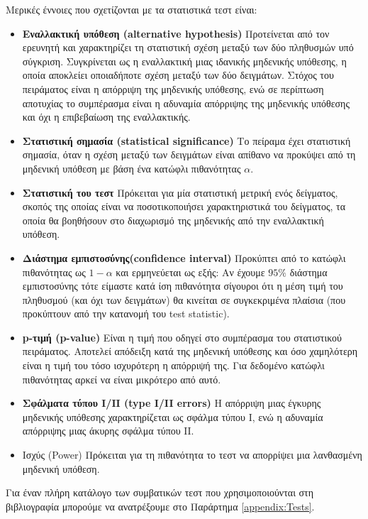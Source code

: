 Μερικές έννοιες που σχετίζονται με τα στατιστικά τεστ είναι:
\begin{itemize}
	\item \textbf{Εναλλακτική υπόθεση (alternative hypothesis)} Προτείνεται από τον ερευνητή και χαρακτηρίζει τη στατιστική σχέση μεταξύ των δύο πληθυσμών υπό σύγκριση. Συγκρίνεται ως η εναλλακτική μιας ιδανικής μηδενικής υπόθεσης, η οποία αποκλείει οποιαδήποτε σχέση μεταξύ των δύο δειγμάτων. Στόχος του πειράματος είναι η απόρριψη της μηδενικής υπόθεσης, ενώ σε περίπτωση αποτυχίας το συμπέρασμα είναι η αδυναμία απόρριψης της μηδενικής υπόθεσης και όχι η επιβεβαίωση της εναλλακτικής.
	\item \textbf{Στατιστική σημασία (statistical significance)} Το πείραμα έχει στατιστική σημασία, όταν η σχέση μεταξύ των δειγμάτων είναι απίθανο να προκύψει από τη μηδενική υπόθεση με βάση ένα κατώφλι πιθανότητας $\alpha$.
	\item \textbf{Στατιστική του τεστ} Πρόκειται για μία στατιστική μετρική ενός δείγματος, σκοπός της οποίας είναι να ποσοτικοποιήσει χαρακτηριστικά του δείγματος, τα οποία θα βοηθήσουν στο διαχωρισμό της μηδενικής από την εναλλακτική υπόθεση.
	\item \textbf{Διάστημα εμπιστοσύνης(confidence interval)}  Προκύπτει από το κατώφλι πιθανότητας ως $1-\alpha$ και ερμηνεύεται ως εξής: Αν έχουμε $95 \%$ διάστημα εμπιστοσύνης τότε είμαστε κατά ίση πιθανότητα σίγουροι ότι η μέση τιμή του πληθυσμού (και όχι των δειγμάτων) θα κινείται σε συγκεκριμένα πλαίσια (που προκύπτουν από την κατανομή του test statistic).
	\item \textbf{p-τιμή (p-value)} Είναι η τιμή που οδηγεί στο συμπέρασμα του στατιστικού πειράματος. Αποτελεί απόδειξη κατά της μηδενική υπόθεσης και όσο χαμηλότερη είναι η τιμή του τόσο ισχυρότερη η απόρριψή της. Για δεδομένο κατώφλι πιθανότητας αρκεί να είναι μικρότερο από αυτό.
	\item \textbf{Σφάλματα τύπου Ι/ΙΙ (type I/II errors)} Η απόρριψη μιας έγκυρης μηδενικής υπόθεσης χαρακτηρίζεται ως σφάλμα τύπου Ι, ενώ η αδυναμία απόρριψης μιας άκυρης σφάλμα τύπου ΙΙ.
	\item {Ισχύς (Power)} Πρόκειται για τη πιθανότητα το τεστ να απορρίψει μια λανθασμένη μηδενική υπόθεση.
\end{itemize}

Για έναν πλήρη κατάλογο των συμβατικών τεστ που χρησιμοποιούνται στη βιβλιογραφία μπορούμε να ανατρέξουμε στο Παράρτημα \ref{appendix:Tests}.
